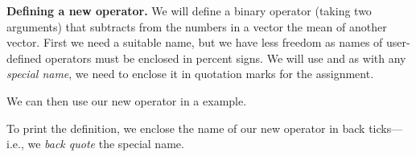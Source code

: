 \documentclass[krantz2]{krantz}\usepackage{knitr}
\begin{document}
\begin{explainbox}
\textbf{Defining a new operator.} We will define a binary operator (taking two arguments) that subtracts from the numbers in a vector the mean of another vector. First we need a suitable name, but we have less freedom as names of user-defined operators must be enclosed in percent signs. We will use  and as with any \emph{special name}, we need to enclose it in quotation marks for the assignment.

\begin{knitrout}\footnotesize
{}\color{fgcolor}
\end{knitrout}

We can then use our new operator in a example.

\begin{knitrout}\footnotesize
{}\color{fgcolor}
\end{knitrout}

To print the definition, we enclose the name of our new operator in back ticks---i.e., we \emph{back quote} the special name.

\begin{knitrout}\footnotesize
{}\color{fgcolor}
\end{knitrout}

\end{explainbox}
\end{document}

